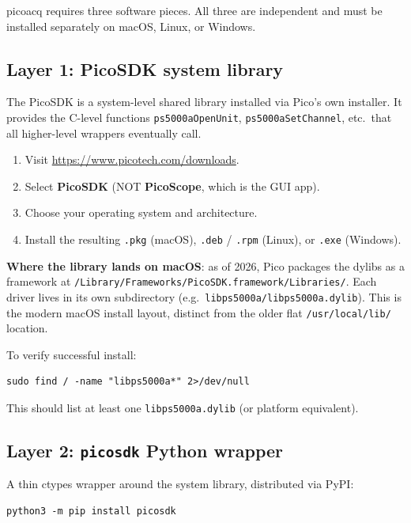 \documentclass[11pt]{article}
\begin{document}
\textsf{picoacq} requires three software pieces.  All three are
independent and must be installed separately on macOS, Linux, or
Windows.

\subsection{Layer 1: PicoSDK system library}

The PicoSDK is a system-level shared library installed via Pico's
own installer.  It provides the C-level functions
\texttt{ps5000aOpenUnit}, \texttt{ps5000aSetChannel}, etc.\ that
all higher-level wrappers eventually call.

\begin{enumerate}\itemsep=2pt
\item Visit \url{https://www.picotech.com/downloads}.
\item Select \textbf{PicoSDK} (NOT \textbf{PicoScope}, which is the
      GUI app).
\item Choose your operating system and architecture.
\item Install the resulting \texttt{.pkg} (macOS), \texttt{.deb}
      / \texttt{.rpm} (Linux), or \texttt{.exe} (Windows).
\end{enumerate}

\textbf{Where the library lands on macOS}: as of 2026, Pico packages
the dylibs as a framework at
\texttt{/Library/Frameworks/PicoSDK.framework/Libraries/}.
Each driver lives in its own subdirectory (e.g.\
\texttt{libps5000a/libps5000a.dylib}).  This is the modern macOS
install layout, distinct from the older flat \texttt{/usr/local/lib/}
location.

To verify successful install:
\begin{lstlisting}[style=shell]
sudo find / -name "libps5000a*" 2>/dev/null
\end{lstlisting}

This should list at least one \texttt{libps5000a.dylib} (or platform
equivalent).

\subsection{Layer 2: \texttt{picosdk} Python wrapper}

A thin ctypes wrapper around the system library, distributed via PyPI:

\begin{lstlisting}[style=shell]
python3 -m pip install picosdk
\end{lstlisting}
\end{document}
